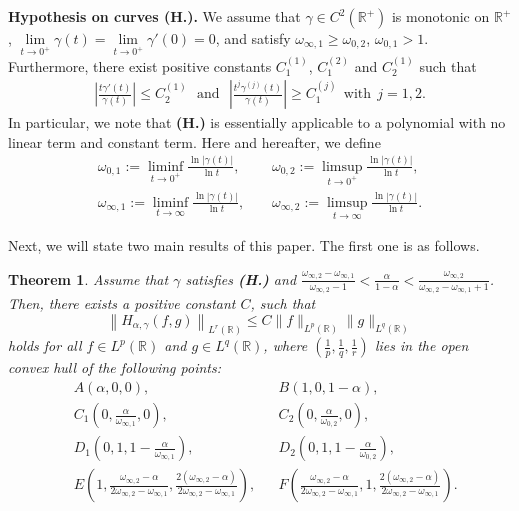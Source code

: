 \documentclass[11pt, twoside, leqno]{article}
\newtheorem{theorem}{Theorem}[section]
\theoremstyle{definition}
\numberwithin{equation}{section}
\begin{document}
\textbf{Hypothesis on curves (H.).} We assume that $\gamma\in C^2(\mathbb{R}^+)$ is monotonic on $\mathbb{R}^+$, $\lim\limits_{t\rightarrow 0^+}\gamma(t)=\lim\limits_{t\rightarrow 0^+}\gamma'(0)=0$, and satisfy $\omega_{\infty,1}\geq \omega_{0,2}$, $\omega_{0,1}>1$.
Furthermore, there exist positive constants $C^{(1)}_{1}$, $C^{(2)}_{1}$ and $C^{(1)}_2$ such that
\begin{align}\label{eq:1.1}
 \left|\frac{t\gamma'(t)}{\gamma(t)}\right|\leq C^{(1)}_2~~~\textrm{and}~~~\left|\frac{t^j\gamma^{(j)}(t)}{\gamma(t)}\right|\geq C^{(j)}_{1}~~\textrm{with}~~j=1,2.
\end{align}
In particular, we note that \textbf{(H.)} is essentially applicable to a polynomial with no linear term and constant term. Here and hereafter, we define
\begin{align*}
\omega_{0,1}:=\liminf\limits_{t\rightarrow0^{+}}{\frac{\ln{|\gamma(t)|}}{\ln t}},~~~~~&\omega_{0,2}:=\limsup\limits_{t\rightarrow0^{+}}{\frac{\ln{|\gamma(t)|}}{\ln t}},\\
\omega_{\infty,1}:=\liminf\limits_{t\rightarrow{\infty}}{\frac{\ln{|\gamma(t)|}}{\ln t}},~~~~~&\omega_{\infty,2}:=\limsup\limits_{t\rightarrow{\infty}}{\frac{\ln{|\gamma(t)|}}{\ln t}}.
\end{align*}

Next, we will state two main results of this paper. The first one is as follows.

\begin{theorem}\label{maintheorem}
Assume that $\gamma$ satisfies {\bf(H.)} and $\frac{\omega_{\infty,2}-\omega_{\infty,1}}{\omega_{\infty,2}-1}<\frac{\alpha}{1-\alpha}<\frac{\omega_{\infty,2}}{\omega_{\infty,2}-\omega_{\infty,1}+1}$. Then, there exists a positive constant $C$, such that
$$\left\|H_{\alpha,\gamma}(f,g)\right\|_{L^{r}(\mathbb{R})}\leq C \|f\|_{L^{p}(\mathbb{R})}\|g\|_{L^{q}(\mathbb{R})}$$
holds for all $f\in L^{p}(\mathbb{R})$ and $g\in L^{q}(\mathbb{R})$, where $(\frac{1}{p},\frac{1}{q},\frac{1}{r})$ lies in the open convex hull of the following points:
\begin{align*}
&A\left(\alpha,0,0\right),&&B\left(1,0,1-\alpha\right),\\
&C_1\left(0,\frac{\alpha}{\omega_{\infty,1}},0\right),&&C_2\left(0,\frac{\alpha}{\omega_{0,2}},0\right),\\
&D_1\left(0,1,1-\frac{\alpha}{\omega_{\infty,1}}\right),&&D_2\left(0,1,1-\frac{\alpha}{\omega_{0,2}}\right),\\
&E\left(1, \frac{\omega_{\infty,2}-\alpha}{2\omega_{\infty,2}-\omega_{\infty,1} }, \frac{2(\omega_{\infty,2}-\alpha)}{2\omega_{\infty,2}-\omega_{\infty,1} }\right),&&F\left(\frac{\omega_{\infty,2}-\alpha}{2\omega_{\infty,2}-\omega_{\infty,1} }, 1, \frac{2(\omega_{\infty,2}-\alpha)}{2\omega_{\infty,2}-\omega_{\infty,1} }\right).
\end{align*}
\end{theorem}
\end{document}
